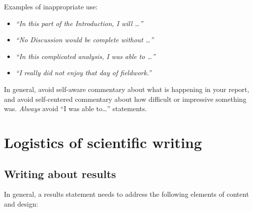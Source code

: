 \documentclass[]{book}
\providecommand{\tightlist}{%
  \setlength{\itemsep}{0pt}\setlength{\parskip}{0pt}}
\begin{document}
Examples of inappropriate use:

\begin{itemize}
\tightlist
\item
  \emph{``In this part of the Introduction, I will \ldots{}''}\\
\item
  \emph{``No Discussion would be complete without \ldots{}''}\\
\item
  \emph{``In this complicated analysis, I was able to \ldots{}''}
\item
  \emph{``I really did not enjoy that day of fieldwork.''}
\end{itemize}

In general, avoid self-aware commentary about what is happening in your report, and avoid self-centered commentary about how difficult or impressive something was. \emph{Always} avoid ``I was able to\ldots{}'' statements.

\hypertarget{logistics-of-scientific-writing}{%
\section*{Logistics of scientific writing}\label{logistics-of-scientific-writing}}

\hypertarget{writing-about-results}{%
\subsection*{Writing about results}\label{writing-about-results}}

In general, a results statement needs to address the following elements of content and design:
\end{document}
